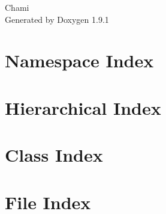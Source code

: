 \let\mypdfximage\pdfximage\def\pdfximage{\immediate\mypdfximage}\documentclass[twoside]{book}
\newcommand{\+}{\discretionary{\mbox{\scriptsize$\hookleftarrow$}}{}{}}
\newcommand{\clearemptydoublepage}{%
  \newpage{\pagestyle{empty}\cleardoublepage}%
}
\begin{document}
\raggedbottom

\begin{titlepage}
\vspace*{7cm}
\begin{center}%
{\Large Chami }\\
\vspace*{1cm}
{\large Generated by Doxygen 1.9.1}\\
\end{center}
\end{titlepage}
\clearemptydoublepage
{}
\tableofcontents
\clearemptydoublepage
{}

\chapter{Namespace Index}

\chapter{Hierarchical Index}

\chapter{Class Index}

\chapter{File Index}

\end{document}
